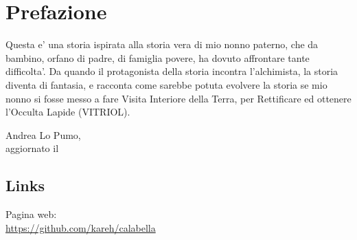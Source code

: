 \chapter{Prefazione}

Questa e' una storia ispirata alla storia vera di mio nonno paterno, che da bambino, orfano di padre, di famiglia povere, ha dovuto affrontare tante difficolta'. Da quando il protagonista della storia incontra l'alchimista, la storia diventa di fantasia, e racconta come sarebbe potuta evolvere la storia se mio nonno si fosse messo a fare Visita Interiore della Terra, per Rettificare ed ottenere l'Occulta Lapide (VITRIOL).

\begin{flushright}
    \vspace*{\fill}
    Andrea Lo Pumo, \finishDate\\
    aggiornato il \lastUpdateDate
\end{flushright}

\section{Links}

Pagina web:\\
\url{https://github.com/kareh/calabella}


